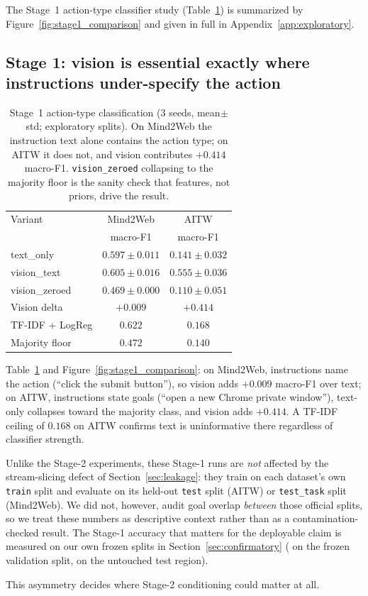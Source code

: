 \newcommand{\expstageone}{%
\subsection{Stage 1: vision is essential exactly where instructions
under-specify the action}

\begin{table}[tb]
\begin{center}
\small
\begin{tabular}{lcc}
\toprule
Variant & Mind2Web & AITW \\
 & macro-F1 & macro-F1 \\
\midrule
text\_only & $0.597 \pm 0.011$ & $0.141 \pm 0.032$ \\
vision\_text & $\mathbf{0.605 \pm 0.016}$ & $\mathbf{0.555 \pm 0.036}$ \\
vision\_zeroed & $0.469 \pm 0.000$ & $0.110 \pm 0.051$ \\
\midrule
Vision delta & $+0.009$ & $+0.414$ \\
TF-IDF + LogReg & $0.622$ & $0.168$ \\
Majority floor & $0.472$ & $0.140$ \\
\bottomrule
\end{tabular}
\end{center}
\caption{Stage~1 action-type classification (3 seeds, mean$\pm$std;
exploratory splits). On Mind2Web the instruction text alone contains the
action type; on AITW it does not, and vision contributes $+0.414$
macro-F1. \texttt{vision\_zeroed} collapsing to the majority floor is the
sanity check that features, not priors, drive the result.}
\label{tab:stage1}
\end{table}

Table~\ref{tab:stage1} and Figure~\ref{fig:stage1_comparison}: on
Mind2Web, instructions name the action (``click the submit button''), so
vision adds $+0.009$ macro-F1 over text; on AITW, instructions state goals
(``open a new Chrome private window''), text-only collapses toward the
majority class, and vision adds $+0.414$. A TF-IDF ceiling of $0.168$ on
AITW confirms text is uninformative there regardless of classifier
strength.

Unlike the Stage-2 experiments, these Stage-1 runs are \emph{not} affected
by the stream-slicing defect of Section~\ref{sec:leakage}: they train on
each dataset's own \texttt{train} split and evaluate on its held-out
\texttt{test} split (AITW) or \texttt{test\_task} split (Mind2Web). We did
not, however, audit goal overlap \emph{between} those official splits, so
we treat these numbers as descriptive context rather than as a
contamination-checked result. The Stage-1 accuracy that matters for the
deployable claim is measured on our own frozen splits in
Section~\ref{sec:confirmatory} (\ConfStageOneValAcc{} on the frozen
validation split, \ConfStageOneAcc{} on the untouched test region).

This asymmetry decides where Stage-2 conditioning could matter
at all.

}
\ifworkshopbuild The Stage~1 action-type classifier study (Table~\ref{tab:stage1}) is
summarized by Figure~\ref{fig:stage1_comparison} and given in full in
Appendix~\ref{app:exploratory}.
\else\expstageone\fi

